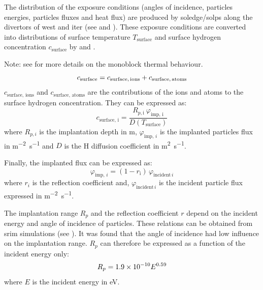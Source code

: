 The distribution of the exposure conditions (angles of incidence, particles energies, particles fluxes and heat flux) are produced by \gls{soledge}/\gls{solps} along the \glspl{divertor} of \gls{west} and \gls{iter} (see  and ).
These exposure conditions are converted into distributions of surface temperature $T_\mathrm{surface}$ and surface hydrogen concentration $c_\mathrm{surface}$ by  and .

Note: see  for more details on the \gls{monoblock} thermal behaviour.
\begin{equation}
    c_\mathrm{surface} = c_\mathrm{surface, \, ions} + c_\mathrm{surface, \, atoms}
    \labeq{c_surface}
\end{equation}
$c_\mathrm{surface, \, ions}$ and $c_\mathrm{surface, \, atoms}$ are the contributions of the ions and atoms to the surface hydrogen concentration.
They can be expressed as:
\begin{equation}
    c_\mathrm{surface, \, i} = \frac{R_{p, \mathrm{i}} \ \varphi_\mathrm{imp, \,i}}{D(T_\mathrm{surface})}
\end{equation}
where $R_{p, i}$ is the implantation depth in \si{m}, $\varphi_{\mathrm{imp}, \,i}$ is the implanted particles flux in \si{m^{-2}.s^{-1}} and $D$ is the \gls{H} diffusion coefficient in \si{m^{2}.s^{-1}}.

Finally, the implanted flux can be expressed as:
\begin{equation}
    \varphi_{\mathrm{imp}, \,i} = (1 - r_\mathrm{i}) \, \varphi_{\mathrm{incident} \, i}
\end{equation}
where $r_i$ is the reflection coefficient and, $\varphi_{\mathrm{incident} \, i}$ is the incident particle flux expressed in \si{m^{-2}.s^{-1}}.

The implantation range $R_p$ and the reflection coefficient $r$ depend on the incident energy and angle of incidence of particles.
These relations can be obtained from \gls{srim}  simulations (see ).
It was found that the angle of incidence had low influence on the implantation range.
$R_p$ can therefore be expressed as a function of the incident energy only:
\begin{equation}
    R_p = 1.9\times 10^{-10} E ^{0.59}
    \labeq{implantation range}
\end{equation}
where $E$ is the incident energy in \si{eV}.

